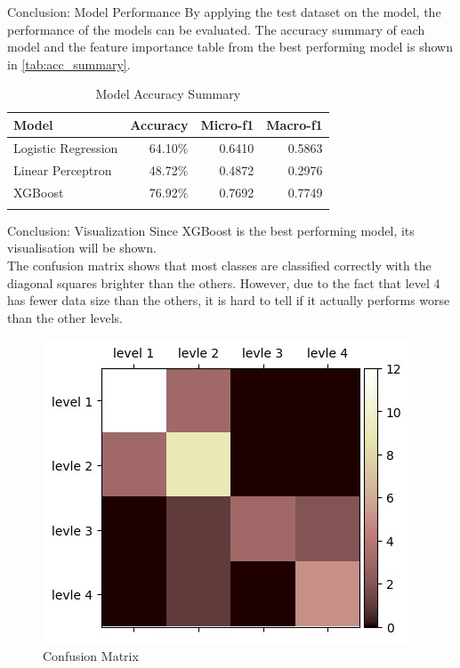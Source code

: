 \begin{frame}{Conclusion: Model Performance}
By applying the test dataset on the model, the performance of the models can be evaluated. The accuracy summary of each 
model and the feature importance table from the best performing model is shown in \autoref{tab:acc_summary}.
\begin{table}
	\caption{Model Accuracy Summary}
	\centering
	\begin{tabular}{lrrr}
		\hline
		\textbf{Model} & \textbf{Accuracy} & \textbf{Micro-f1} & \textbf{Macro-f1} \\
		\hline
		Logistic Regression & 64.10\% & 0.6410 & 0.5863 \\
		Linear Perceptron & 48.72\% & 0.4872 & 0.2976 \\
		XGBoost & 76.92\% & 0.7692 &0.7749 \\
		\hline
	\label{tab:acc_summary}
	\end{tabular}
\end{table}
\end{frame}
\begin{frame}{Conclusion: Visualization}
Since XGBoost is the best performing model, its visualisation will be shown. 
\\The confusion matrix shows that most classes are classified correctly with the diagonal squares brighter than the others. However, due to the fact that level 4 has fewer data size than the others, it is hard to tell if it actually performs worse than the other levels. 

\begin{figure}[H]
    \centering
    \includegraphics[width=0.4\linewidth]{images/illustrate/confma.jpeg}
    \caption{Confusion Matrix}
    \end{figure}

\end{frame}

